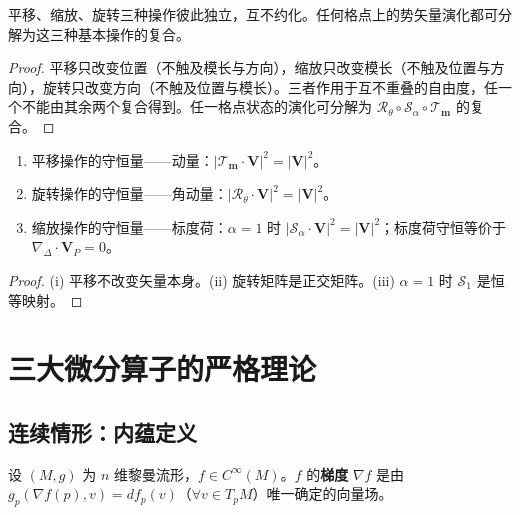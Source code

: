 \begin{proposition}[三种操作的不可互约性]\label{prop:lattice_operations_irreducibility}
平移、缩放、旋转三种操作彼此独立，互不约化。任何格点上的势矢量演化都可分解为这三种基本操作的复合。
\end{proposition}

\begin{proof}
平移只改变位置（不触及模长与方向），缩放只改变模长（不触及位置与方向），旋转只改变方向（不触及位置与模长）。三者作用于互不重叠的自由度，任一个不能由其余两个复合得到。任一格点状态的演化可分解为 $\mathcal{R}_\theta\circ\mathcal{S}_\alpha\circ\mathcal{T}_{\mathbf{m}}$ 的复合。
\end{proof}

\begin{theorem}[三种操作在离散格点上的守恒律]\label{thm:lattice_three_conservation}
\begin{enumerate}[label=(\roman*)]
    \item 平移操作的守恒量——动量：$|\mathcal{T}_{\mathbf{m}}\cdot\mathbf{V}|^2=|\mathbf{V}|^2$。
    \item 旋转操作的守恒量——角动量：$|\mathcal{R}_\theta\cdot\mathbf{V}|^2=|\mathbf{V}|^2$。
    \item 缩放操作的守恒量——标度荷：$\alpha=1$ 时 $|\mathcal{S}_\alpha\cdot\mathbf{V}|^2=|\mathbf{V}|^2$；标度荷守恒等价于 $\nabla_{\Delta}\cdot\mathbf{V}_P=0$。
\end{enumerate}
\end{theorem}

\begin{proof}
(i) 平移不改变矢量本身。(ii) 旋转矩阵是正交矩阵。(iii) $\alpha=1$ 时 $\mathcal{S}_1$ 是恒等映射。
\end{proof}

\section{三大微分算子的严格理论}\label{sec:three_operators_strict}

\subsection{连续情形：内蕴定义}

\begin{definition}[梯度——内蕴定义]\label{def:gradient_intrinsic}
设 $(M,g)$ 为 $n$ 维黎曼流形，$f\in C^\infty(M)$。$f$ 的\textbf{梯度} $\nabla f$ 是由 $g_p(\nabla f(p),v)=df_p(v)$（$\forall v\in T_pM$）唯一确定的向量场。
\end{definition}

